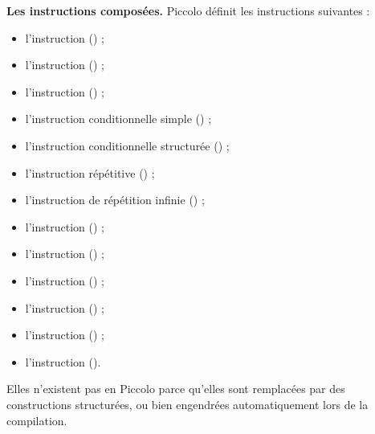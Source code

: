 \textbf{Les instructions composées.} Piccolo définit les instructions suivantes :
\begin{itemize}
  \item l'instruction  () ;
  \item l'instruction  () ;
  \item l'instruction  () ;
  \item l'instruction conditionnelle simple () ;
  \item l'instruction conditionnelle structurée () ;
  \item l'instruction répétitive () ;
  \item l'instruction de répétition infinie () ;
  \item l'instruction  () ;
  \item l'instruction  () ;
  \item l'instruction  () ;
  \item l'instruction  () ;
  \item l'instruction  () ;
  \item l'instruction  ().
\end{itemize}





Elles n’existent pas en Piccolo parce qu’elles sont remplacées par des constructions structurées, ou bien engendrées automatiquement lors de la compilation.

